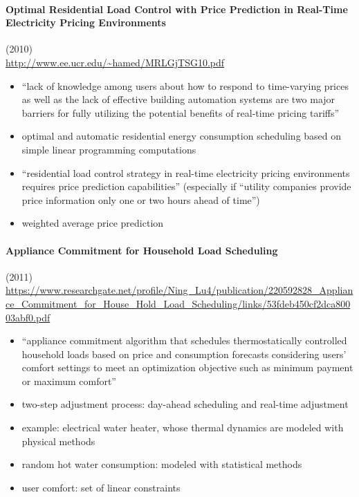 \documentclass{article}
\begin{document}
\paragraph{Optimal Residential Load Control with Price Prediction in Real-Time Electricity Pricing Environments} (2010)
\cite{mohsenian2010optimal} \\
\url{http://www.ee.ucr.edu/~hamed/MRLGjTSG10.pdf}
\begin{itemize}
\item ``lack of knowledge among users about how to respond to time-varying prices as well as the lack of effective building automation systems are two major barriers for fully utilizing the potential benefits of real-time pricing tariffs''
\item optimal and automatic residential energy consumption scheduling based on simple linear programming computations
\item ``residential load control strategy in real-time electricity pricing environments requires price prediction capabilities'' (especially if ``utility companies provide price information only one or two hours ahead of time'')
\item weighted average price prediction
\end{itemize}

\paragraph{Appliance Commitment for Household Load Scheduling} (2011)
\cite{du2011appliance} \\
\url{https://www.researchgate.net/profile/Ning_Lu4/publication/220592828_Appliance_Commitment_for_House_Hold_Load_Scheduling/links/53fdeb450cf2dca80003abf0.pdf}
\begin{itemize}
\item ``appliance commitment algorithm that schedules thermostatically controlled household loads based on price and consumption forecasts considering users’ comfort settings to meet an optimization objective such as minimum payment or maximum comfort''
\item two-step adjustment process: day-ahead scheduling and real-time adjustment
\item example: electrical water heater, whose thermal dynamics are modeled with physical methods
\item random hot water consumption: modeled with statistical methods
\item user comfort: set of linear constraints
\end{itemize}
\end{document}
